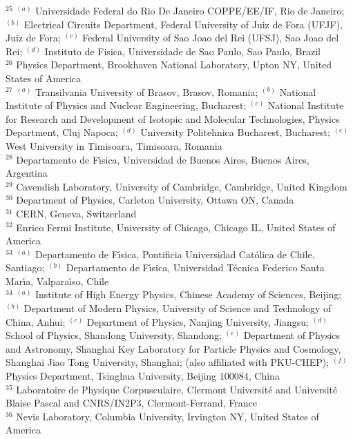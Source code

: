 \begin{flushleft}
$^{25}$ $^{(a)}$ Universidade Federal do Rio De Janeiro COPPE/EE/IF, Rio de Janeiro; $^{(b)}$ Electrical Circuits Department, Federal University of Juiz de Fora (UFJF), Juiz de Fora; $^{(c)}$ Federal University of Sao Joao del Rei (UFSJ), Sao Joao del Rei; $^{(d)}$ Instituto de Fisica, Universidade de Sao Paulo, Sao Paulo, Brazil\\
$^{26}$ Physics Department, Brookhaven National Laboratory, Upton NY, United States of America\\
$^{27}$ $^{(a)}$ Transilvania University of Brasov, Brasov, Romania; $^{(b)}$ National Institute of Physics and Nuclear Engineering, Bucharest; $^{(c)}$ National Institute for Research and Development of Isotopic and Molecular Technologies, Physics Department, Cluj Napoca; $^{(d)}$ University Politehnica Bucharest, Bucharest; $^{(e)}$ West University in Timisoara, Timisoara, Romania\\
$^{28}$ Departamento de F{\'\i}sica, Universidad de Buenos Aires, Buenos Aires, Argentina\\
$^{29}$ Cavendish Laboratory, University of Cambridge, Cambridge, United Kingdom\\
$^{30}$ Department of Physics, Carleton University, Ottawa ON, Canada\\
$^{31}$ CERN, Geneva, Switzerland\\
$^{32}$ Enrico Fermi Institute, University of Chicago, Chicago IL, United States of America\\
$^{33}$ $^{(a)}$ Departamento de F{\'\i}sica, Pontificia Universidad Cat{\'o}lica de Chile, Santiago; $^{(b)}$ Departamento de F{\'\i}sica, Universidad T{\'e}cnica Federico Santa Mar{\'\i}a, Valpara{\'\i}so, Chile\\
$^{34}$ $^{(a)}$ Institute of High Energy Physics, Chinese Academy of Sciences, Beijing; $^{(b)}$ Department of Modern Physics, University of Science and Technology of China, Anhui; $^{(c)}$ Department of Physics, Nanjing University, Jiangsu; $^{(d)}$ School of Physics, Shandong University, Shandong; $^{(e)}$ Department of Physics and Astronomy, Shanghai Key Laboratory for  Particle Physics and Cosmology, Shanghai Jiao Tong University, Shanghai; (also affiliated with PKU-CHEP); $^{(f)}$ Physics Department, Tsinghua University, Beijing 100084, China\\
$^{35}$ Laboratoire de Physique Corpusculaire, Clermont Universit{\'e} and Universit{\'e} Blaise Pascal and CNRS/IN2P3, Clermont-Ferrand, France\\
$^{36}$ Nevis Laboratory, Columbia University, Irvington NY, United States of America\\

\end{flushleft}
